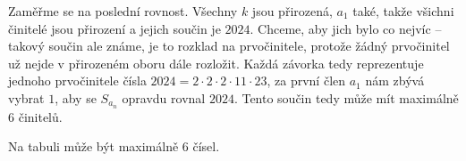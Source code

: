 \documentclass{article}
\begin{document}
Zaměřme se na poslední rovnost. Všechny $k$ jsou přirozená, $a_1$ také, takže všichni činitelé jsou přirození a jejich součin je $2024$. Chceme, aby jich bylo co nejvíc -- takový součin ale známe, je to rozklad na prvočinitele, protože žádný prvočinitel už nejde v přirozeném oboru dále rozložit. Každá závorka tedy reprezentuje jednoho prvočinitele čísla $2024 = 2 \cdot 2 \cdot 2 \cdot 11 \cdot 23$, za první člen $a_1$ nám zbývá vybrat $1$, aby se $S_{a_n}$ opravdu rovnal $2024$. Tento součin tedy může mít maximálně $6$ činitelů.

\textbf{ }

Na tabuli může být maximálně $6$ čísel.
\end{document}
